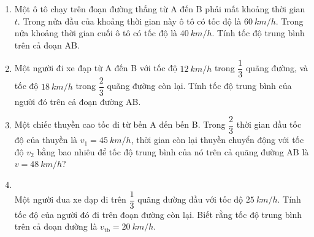 \begin{enumerate}[label=\bfseries Bài \arabic*:,leftmargin=1.5cm]
{}

\item {}

{
	
	Một ô tô chạy trên đoạn đường thẳng từ A đến B phải mất khoảng thời gian $t$. Trong nửa đầu của khoảng thời gian này ô tô có tốc độ là $\SI{60}{km/h}$. Trong nửa khoảng thời gian cuối ô tô có tốc độ là $\SI{40}{km/h}$. Tính tốc độ trung bình trên cả đoạn AB.
}



\item {}

{
	
	Một người đi xe đạp từ A đến B với tốc độ $\SI{12}{km/h}$ trong $\dfrac{1}{3}$ quãng đường, và tốc độ $\SI{18}{km/h}$ trong $\dfrac{2}{3}$ quãng đường còn lại. Tính tốc độ trung bình của người đó trên cả đoạn đường AB.
}

\item {}

{
	
	Một chiếc thuyền cao tốc đi từ bến A đến bến B. Trong $\dfrac{2}{3}$ thời gian đầu tốc độ của thuyền là $v_1 = \SI{45}{km/h}$, thời gian còn lại thuyền chuyển động với tốc độ $v_2$ bằng bao nhiêu để tốc độ trung bình của nó trên cả quãng đường AB là $v = \SI{48}{km/h}$?
	
}

\item {}\\
{	Một người đua xe đạp đi trên $\dfrac{1}{3}$ quãng đường đầu với tốc độ $\SI{25}{km/h}$. Tính tốc độ của người đó đi trên đoạn đường còn lại. Biết rằng tốc độ trung bình trên cả đoạn đường là $v_\text{tb} = \SI{20}{km/h}$.
}





\end{enumerate}
